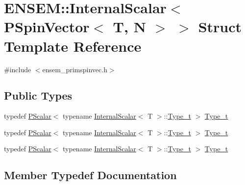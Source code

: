 \hypertarget{structENSEM_1_1InternalScalar_3_01PSpinVector_3_01T_00_01N_01_4_01_4}{}\section{E\+N\+S\+EM\+:\+:Internal\+Scalar$<$ P\+Spin\+Vector$<$ T, N $>$ $>$ Struct Template Reference}
\label{structENSEM_1_1InternalScalar_3_01PSpinVector_3_01T_00_01N_01_4_01_4}


{\ttfamily \#include $<$ensem\+\_\+primspinvec.\+h$>$}

\subsection*{Public Types}
\begin{DoxyCompactItemize}
\item 
typedef \mbox{\hyperlink{classENSEM_1_1PScalar}{P\+Scalar}}$<$ typename \mbox{\hyperlink{structENSEM_1_1InternalScalar}{Internal\+Scalar}}$<$ T $>$\+::\mbox{\hyperlink{structENSEM_1_1InternalScalar_3_01PSpinVector_3_01T_00_01N_01_4_01_4_a65d7d95d2a184abe920b5589a148ce04}{Type\+\_\+t}} $>$ \mbox{\hyperlink{structENSEM_1_1InternalScalar_3_01PSpinVector_3_01T_00_01N_01_4_01_4_a65d7d95d2a184abe920b5589a148ce04}{Type\+\_\+t}}
\item 
typedef \mbox{\hyperlink{classENSEM_1_1PScalar}{P\+Scalar}}$<$ typename \mbox{\hyperlink{structENSEM_1_1InternalScalar}{Internal\+Scalar}}$<$ T $>$\+::\mbox{\hyperlink{structENSEM_1_1InternalScalar_3_01PSpinVector_3_01T_00_01N_01_4_01_4_a65d7d95d2a184abe920b5589a148ce04}{Type\+\_\+t}} $>$ \mbox{\hyperlink{structENSEM_1_1InternalScalar_3_01PSpinVector_3_01T_00_01N_01_4_01_4_a65d7d95d2a184abe920b5589a148ce04}{Type\+\_\+t}}
\item 
typedef \mbox{\hyperlink{classENSEM_1_1PScalar}{P\+Scalar}}$<$ typename \mbox{\hyperlink{structENSEM_1_1InternalScalar}{Internal\+Scalar}}$<$ T $>$\+::\mbox{\hyperlink{structENSEM_1_1InternalScalar_3_01PSpinVector_3_01T_00_01N_01_4_01_4_a65d7d95d2a184abe920b5589a148ce04}{Type\+\_\+t}} $>$ \mbox{\hyperlink{structENSEM_1_1InternalScalar_3_01PSpinVector_3_01T_00_01N_01_4_01_4_a65d7d95d2a184abe920b5589a148ce04}{Type\+\_\+t}}
\end{DoxyCompactItemize}


\subsection{Member Typedef Documentation}
\mbox{\label{structENSEM_1_1InternalScalar_3_01PSpinVector_3_01T_00_01N_01_4_01_4_a65d7d95d2a184abe920b5589a148ce04}} 
